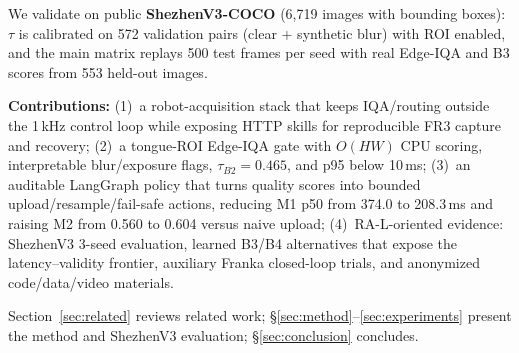 We validate on public \textbf{ShezhenV3-COCO} (6{,}719 images with bounding boxes): $\tau$ is calibrated on 572 validation pairs (clear + synthetic blur) with ROI enabled, and the main matrix replays 500 test frames per seed with real Edge-IQA and B3 scores from 553 held-out images.

\textbf{Contributions:} (1)~a robot-acquisition stack that keeps IQA/routing outside the 1\,kHz control loop while exposing HTTP skills for reproducible FR3 capture and recovery;
(2)~a tongue-ROI Edge-IQA gate with $O(HW)$ CPU scoring, interpretable blur/exposure flags, $\tau_{B2}{=}0.465$, and p95 below 10\,ms;
(3)~an auditable LangGraph policy that turns quality scores into bounded upload/resample/fail-safe actions, reducing M1 p50 from 374.0 to 208.3\,ms and raising M2 from 0.560 to 0.604 versus naive upload;
(4)~RA-L-oriented evidence: ShezhenV3 3-seed evaluation, learned B3/B4 alternatives that expose the latency--validity frontier, auxiliary Franka closed-loop trials, and anonymized code/data/video materials.

Section~\ref{sec:related} reviews related work; \S\ref{sec:method}--\ref{sec:experiments} present the method and ShezhenV3 evaluation; \S\ref{sec:conclusion} concludes.
